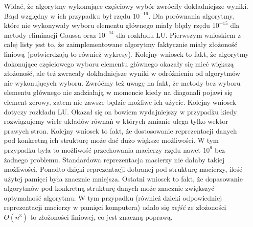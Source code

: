\documentclass[]{article}
\begin{document}
Widać, że algorytmy wykonujące częściowy wybór zwróciły dokładniejsze wyniki. Błąd względny w ich przypadku był rzędu $10^{-16}$. Dla porównania algorytmy, które nie wykonywały wyboru elementu głównego miały błędy rzędu $10^{-15}$ dla metody eliminacji Gaussa oraz $10^{-14}$ dla rozkładu LU.
\clearpage
Pierwszym wnioskiem z całej listy jest to, że zaimplementowane algorytmy faktycznie miały złożoność liniową (potwierdzają to również wykresy). Kolejny wniosek to fakt, że algorytmy dokonujące częściowego wyboru elementu głównego okazały się mieć większą złożoność, ale też zwracały dokładniejsze wyniki w odróżnieniu od algorytmów nie wykonujących wyboru. Zwróćmy też uwagę na fakt, że metody bez wyboru elementu głównego nie zadziałają w momencie kiedy na diagonali pojawi się element zerowy, zatem nie zawsze będzie możliwe ich użycie. Kolejny wniosek dotyczy rozkładu LU. Okazał się on bowiem wydajniejszy w przypadku kiedy rozwiązujemy wiele układów równań w których zmianie ulega tylko wektor prawych stron.
Kolejny wniosek to fakt, że dostosowanie reprezentacji danych pod konkretną ich strukturę może dać dużo większe możliwości. W tym przypadku była to możliwość przechowania macierzy rzędu nawet $10^6$ bez żadnego problemu. Standardowa reprezentacja macierzy nie dałaby takiej możliwości. Ponadto dzięki reprezentacji dobranej pod strukturę macierzy, ilość użytej pamięci była znacznie mniejsza. Ostatni wniosek to fakt, że dopasowanie algorytmów pod konkretną strukturę danych może znacznie zwiększyć optymalność algorytmu. W tym przypadku (również dzieki odpowiedniej reprezentacji macierzy w pamięci komputera) udało się \textit{zejść} ze złożoności $O(n^3)$ to złożoności liniowej, co jest znaczną poprawą.
\end{document}
